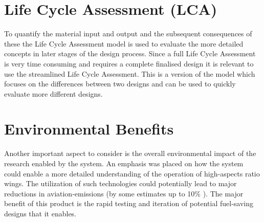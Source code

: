 \section{Life Cycle Assessment (LCA)}

To quantify the material input and output and the subsequent consequences of these the Life Cycle Assessment model is used to evaluate the more detailed concepts in later stages of the design process. Since a full Life Cycle Assessment is very time consuming and requires a complete finalised design it is relevant to use the streamlined Life Cycle Assessment. This is a version of the model which focuses on the differences between two designs and can be used to quickly evaluate more different designs\cite{Vogtlander2012}. 

\section{Environmental Benefits}

Another important aspect to consider is the overall environmental impact of the research enabled by the system. An emphasis was placed on how the system could enable a more detailed understanding of the operation of high-aspects ratio wings. 
The utilization of such technologies could potentially lead to major reductions in aviation-emissions (by some estimates up to 10\% \cite{Ma2024}). The major benefit of this product is the rapid testing and iteration of potential fuel-saving designs that it enables.     